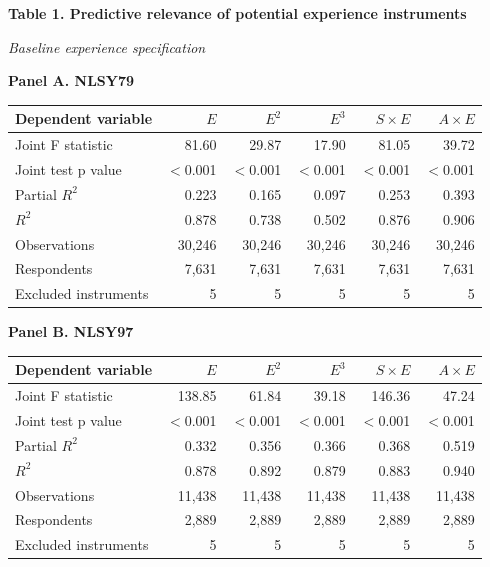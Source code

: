 \documentclass[10pt,letterpaper]{article}
\begin{document}
\begin{center}
{\large\bfseries Table 1. Predictive relevance of potential experience instruments}\par
\smallskip
\textit{Baseline experience specification}\par
\medskip
\end{center}
\small
\noindent\textbf{Panel A. NLSY79}\par\smallskip
\noindent\begin{tabular*}{\textwidth}{@{\extracolsep{\fill}}lrrrrr@{}}
\toprule
Dependent variable & $E$ & $E^2$ & $E^3$ & $S\times E$ & $A\times E$ \\
\midrule
Joint F statistic & 81.60 & 29.87 & 17.90 & 81.05 & 39.72 \\
Joint test p value & $<$0.001 & $<$0.001 & $<$0.001 & $<$0.001 & $<$0.001 \\
Partial $R^2$ & 0.223 & 0.165 & 0.097 & 0.253 & 0.393 \\
$R^2$ & 0.878 & 0.738 & 0.502 & 0.876 & 0.906 \\
Observations & 30,246 & 30,246 & 30,246 & 30,246 & 30,246 \\
Respondents & 7,631 & 7,631 & 7,631 & 7,631 & 7,631 \\
Excluded instruments & 5 & 5 & 5 & 5 & 5 \\
\bottomrule
\end{tabular*}\par\smallskip
\medskip
\noindent\textbf{Panel B. NLSY97}\par\smallskip
\noindent\begin{tabular*}{\textwidth}{@{\extracolsep{\fill}}lrrrrr@{}}
\toprule
Dependent variable & $E$ & $E^2$ & $E^3$ & $S\times E$ & $A\times E$ \\
\midrule
Joint F statistic & 138.85 & 61.84 & 39.18 & 146.36 & 47.24 \\
Joint test p value & $<$0.001 & $<$0.001 & $<$0.001 & $<$0.001 & $<$0.001 \\
Partial $R^2$ & 0.332 & 0.356 & 0.366 & 0.368 & 0.519 \\
$R^2$ & 0.878 & 0.892 & 0.879 & 0.883 & 0.940 \\
Observations & 11,438 & 11,438 & 11,438 & 11,438 & 11,438 \\
Respondents & 2,889 & 2,889 & 2,889 & 2,889 & 2,889 \\
Excluded instruments & 5 & 5 & 5 & 5 & 5 \\
\bottomrule
\end{tabular*}\par\smallskip
\end{document}
